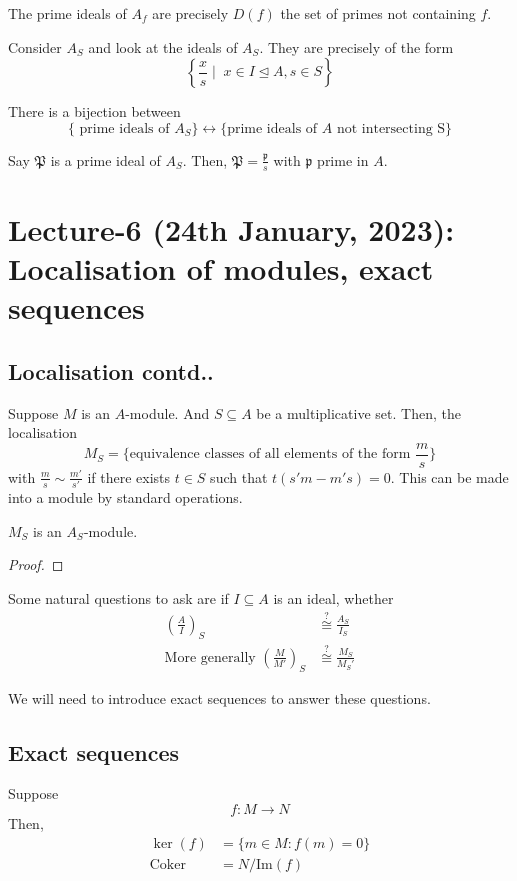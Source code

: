 \documentclass[oneside, 12pt, ]{scrbook}
\newcommand{\pr}{\mathfrak{p}}
\newcommand{\iM}{\mathrm{Im}}
\newcommand{\coker}{\mathrm{Coker}}
\theoremstyle{theorem}
\begin{document}
\begin{theorem}
The prime ideals of $A_{f}$ are precisely $D(f)$ the set of primes not containing $f$.
\end{theorem}

Consider $A_{S}$ and look at the ideals of $A_{S}$. They are precisely of the form $$\left \{ \frac{x}{s} \mid \;  x \in I \unlhd A, s  \in S \right\}$$

There is a bijection between $$\{ \text{ prime ideals of } A_{S} \} \leftrightarrow \{ \text{prime ideals of } A \text{ not intersecting S} \}$$

Say $\mathfrak{P}$ is a prime ideal of $A_{S}$. Then, $\mathfrak{P} = \frac{\pr}{s}$ with $\pr$ prime in $A$.


\chapter{Lecture-6 (24th January, 2023): Localisation of modules, exact sequences}

\section{Localisation contd..}

Suppose $M$ is an $A$-module. And $S\subseteq A$ be a multiplicative set. Then, the localisation $$M_{S} = \{\text{equivalence classes of all elements of the form } \frac{m}{s}\}$$ with $\frac{m}{s} \sim \frac{m'}{s'}$ if there exists $t\in S$ such that $t(s'm - m's)=0$. This can be made into a module by standard operations. 

\begin{lemma}
$M_{S}$ is an $A_{S}$-module.
\end{lemma}

\begin{proof}

\end{proof}

Some natural questions to ask are if $I \subseteq A$ is an ideal, whether 
\begin{align*}
\left( \frac{A}{I} \right)_{S} &\overset{?}{\cong} \frac{A_{S}}{I_{S}} \\
\text{More generally } \left( \frac{M}{M'} \right)_{S} &\overset{?}{\cong} \frac{M_{S}}{M_{S}'}
\end{align*}


We will need to introduce exact sequences to answer these questions.

\section{Exact sequences}
Suppose $$f: M \rightarrow N$$ Then, 
\begin{align*}
\ker(f) &= \{m \in M : f(m)=0\} \\
\coker &= N/\iM(f)
\end{align*}
\end{document}
